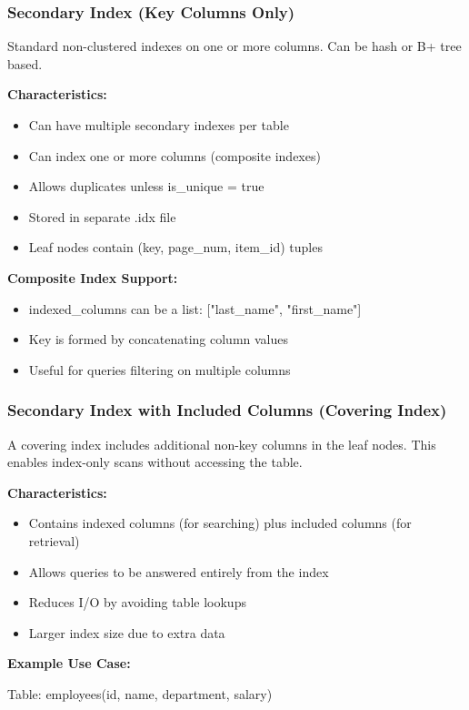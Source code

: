 \documentclass[11pt,a4paper]{article}
\begin{document}
\subsubsection{Secondary Index (Key Columns Only)}

Standard non-clustered indexes on one or more columns. Can be hash or B+ tree based.

\textbf{Characteristics:}
\begin{itemize}
\item Can have multiple secondary indexes per table
\item Can index one or more columns (composite indexes)
\item Allows duplicates unless is\_unique = true
\item Stored in separate .idx file
\item Leaf nodes contain (key, page\_num, item\_id) tuples
\end{itemize}

\textbf{Composite Index Support:}
\begin{itemize}
\item indexed\_columns can be a list: ["last\_name", "first\_name"]
\item Key is formed by concatenating column values
\item Useful for queries filtering on multiple columns
\end{itemize}

\subsubsection{Secondary Index with Included Columns (Covering Index)}

A covering index includes additional non-key columns in the leaf nodes. This enables index-only scans without accessing the table.

\textbf{Characteristics:}
\begin{itemize}
\item Contains indexed columns (for searching) plus included columns (for retrieval)
\item Allows queries to be answered entirely from the index
\item Reduces I/O by avoiding table lookups
\item Larger index size due to extra data
\end{itemize}

\textbf{Example Use Case:}

Table: employees(id, name, department, salary)
\end{document}
